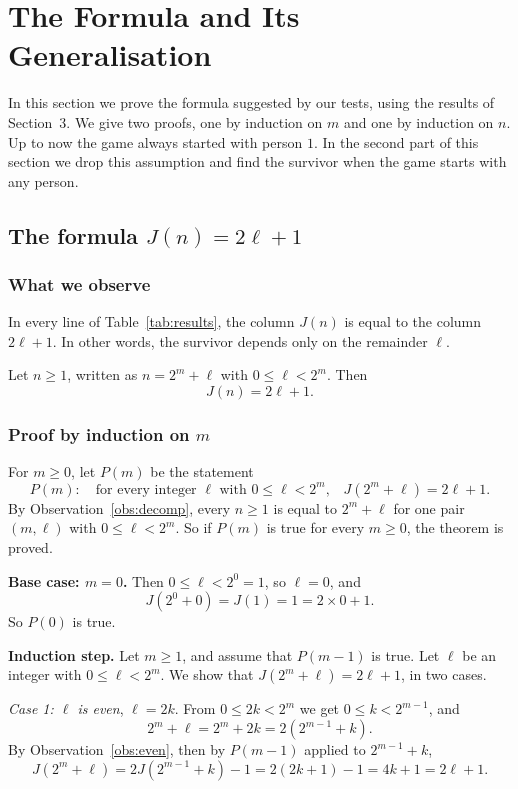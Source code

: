 \section{The Formula and Its Generalisation}

In this section we prove the formula suggested by our tests, using the
results of Section~3. We give two proofs, one by induction on $m$ and one by
induction on $n$. Up to now the game always started with person $1$. In
the second part of this section we drop this assumption and find the survivor
when the game starts with any person.

\subsection{The formula \texorpdfstring{$J(n)=2\ell+1$}{J(n) = 2l + 1}}\label{sec:formula}

\subsubsection{What we observe}

In every line of Table~\ref{tab:results}, the column $J(n)$ is equal to the
column $2\ell+1$. In other words, the survivor depends only on the remainder
$\ell$.

\begin{theo}\label{thm:main}
Let $n\geq1$, written as $n=2^m+\ell$ with $0\leq\ell<2^m$. Then
\[
J(n)=2\ell+1 .
\]
\end{theo}

\subsubsection{Proof by induction on \texorpdfstring{$m$}{m}}

For $m\geq0$, let $P(m)$ be the statement
\[
P(m):\quad\text{for every integer $\ell$ with $0\leq\ell<2^m$,}\quad
J(2^m+\ell)=2\ell+1 .
\]
By Observation~\ref{obs:decomp}, every $n\geq1$ is equal to $2^m+\ell$ for
one pair $(m,\ell)$ with $0\leq\ell<2^m$. So if $P(m)$ is true for every
$m\geq0$, the theorem is proved.

\textbf{Base case: $m=0$.} Then $0\leq\ell<2^0=1$, so $\ell=0$, and
\[
J(2^0+0)=J(1)=1=2\times0+1 .
\]
So $P(0)$ is true.

\textbf{Induction step.} Let $m\geq1$, and assume that $P(m-1)$ is true. Let
$\ell$ be an integer with $0\leq\ell<2^m$. We show that
$J(2^m+\ell)=2\ell+1$, in two cases.

\emph{Case 1: $\ell$ is even}, $\ell=2k$. From $0\leq2k<2^m$ we get
$0\leq k<2^{m-1}$, and
\[
2^m+\ell=2^m+2k=2\left(2^{m-1}+k\right).
\]
By Observation~\ref{obs:even}, then by $P(m-1)$ applied to $2^{m-1}+k$,
\[
J(2^m+\ell)=2J\!\left(2^{m-1}+k\right)-1=2(2k+1)-1=4k+1=2\ell+1 .
\]

